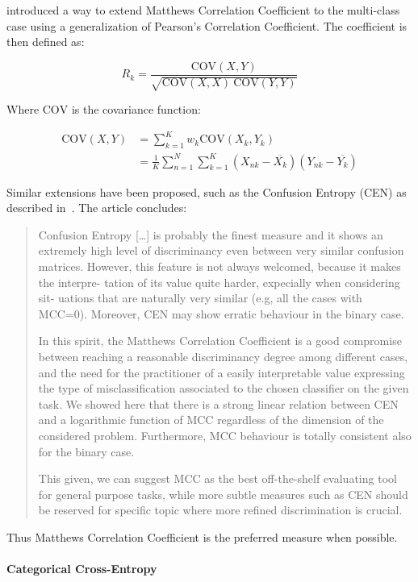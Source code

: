 \cite{Gorodkin:2004aa} introduced a way to extend Matthews Correlation Coefficient to the multi-class case using a generalization of Pearson’s Correlation Coefficient. The coefficient is then defined as:

\begin{equation}
  R_k  = \frac{\text{COV}(X, Y)}{\sqrt{\text{COV}(X, X) \ \text{COV}(Y, Y)}}
\end{equation}

Where $\text{COV}$ is the covariance function:

\begin{align}
  \text{COV}(X, Y) &= \sum_{k=1}^K w_k \text{COV}(X_k, Y_k) \\
  &= \frac{1}{K} \sum_{n=1}^N \sum_{k=1}^K (X_{nk} - \overline{X_k})(Y_{nk} - \overline{Y_k})
\end{align}

Similar extensions have been proposed, such as the Confusion Entropy (CEN) as described in~\cite{Jurman:2012aa}. The article concludes:

\blockquote{Confusion Entropy [\ldots] is probably the finest measure and it shows an extremely high level of discriminancy even between very similar confusion matrices. However, this feature is not always welcomed, because it makes the interpre- tation of its value quite harder, expecially when considering sit- uations that are naturally very similar (e.g, all the cases with MCC=0). Moreover, CEN may show erratic behaviour in the binary case.

In this spirit, the Matthews Correlation Coefficient is a good compromise between reaching a reasonable discriminancy degree among different cases, and the need for the practitioner of a easily interpretable value expressing the type of misclassification associated to the chosen classifier on the given task. We showed here that there is a strong linear relation between CEN and a logarithmic function of MCC regardless of the dimension of the considered problem. Furthermore, MCC behaviour is totally consistent also for the binary case.

This given, we can suggest MCC as the best off-the-shelf evaluating tool for general purpose tasks, while more subtle measures such as CEN should be reserved for specific topic where more refined discrimination is crucial.}

Thus Matthews Correlation Coefficient is the preferred measure when possible.

\paragraph{Categorical Cross-Entropy}
\label{par:Categorical Cross-Entropy}

